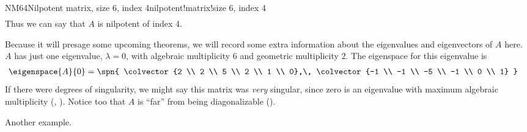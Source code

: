 \begin{example}{NM64}{Nilpotent matrix, size 6, index 4}{nilpotent!matrix!size 6, index 4}
\begin{align*}
%
\end{align*}
%
Thus we can say that $A$ is nilpotent of index 4.\par
%
Because it will presage some upcoming theorems, we will record some extra information about the eigenvalues and eigenvectors of $A$ here.  $A$ has just one eigenvalue, $\lambda=0$, with algebraic multiplicity $6$ and geometric multiplicity $2$.  The eigenspace for this eigenvalue is
%
\begin{align*}
\eigenspace{A}{0}
&=
\spn{
\colvector{2 \\ 2 \\ 5 \\ 2 \\ 1 \\ 0},\,
\colvector{-1 \\ -1 \\ -5 \\ -1 \\ 0 \\ 1}
}
%
\end{align*}
%
If there were degrees of singularity, we might say this matrix was {\em very} singular, since zero is an eigenvalue with maximum algebraic multiplicity (, ).  Notice too that $A$ is ``far'' from being diagonalizable ().
%
\end{example}
%
Another example.
%
